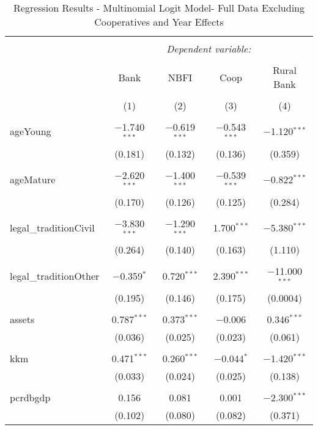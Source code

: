 \documentclass[a4paper,nobind]{templates/ociamthesis}
\begin{document}
\begin{table}[!htbp] \centering 
  \caption{Regression Results - Multinomial Logit Model- Full Data Excluding Cooperatives and Year Effects} 
  \label{} 
\footnotesize 
\begin{tabular}{@{\extracolsep{5pt}}lcccc} 
\\[-1.8ex]\hline 
\hline \\[-1.8ex] 
 & \multicolumn{4}{c}{\textit{Dependent variable:}} \\ 
\cline{2-5} 
\\[-1.8ex] & Bank & NBFI & Coop & Rural Bank \\ 
\\[-1.8ex] & (1) & (2) & (3) & (4)\\ 
\hline \\[-1.8ex] 
 ageYoung & $-$1.740$^{***}$ & $-$0.619$^{***}$ & $-$0.543$^{***}$ & $-$1.120$^{***}$ \\ 
  & (0.181) & (0.132) & (0.136) & (0.359) \\ 
  & & & & \\ 
 ageMature & $-$2.620$^{***}$ & $-$1.400$^{***}$ & $-$0.539$^{***}$ & $-$0.822$^{***}$ \\ 
  & (0.170) & (0.126) & (0.125) & (0.284) \\ 
  & & & & \\ 
 legal\_traditionCivil & $-$3.830$^{***}$ & $-$1.290$^{***}$ & 1.700$^{***}$ & $-$5.380$^{***}$ \\ 
  & (0.264) & (0.140) & (0.163) & (1.110) \\ 
  & & & & \\ 
 legal\_traditionOther & $-$0.359$^{*}$ & 0.720$^{***}$ & 2.390$^{***}$ & $-$11.000$^{***}$ \\ 
  & (0.195) & (0.146) & (0.175) & (0.0004) \\ 
  & & & & \\ 
 assets & 0.787$^{***}$ & 0.373$^{***}$ & $-$0.006 & 0.346$^{***}$ \\ 
  & (0.036) & (0.025) & (0.023) & (0.061) \\ 
  & & & & \\ 
 kkm & 0.471$^{***}$ & 0.260$^{***}$ & $-$0.044$^{*}$ & $-$1.420$^{***}$ \\ 
  & (0.033) & (0.024) & (0.025) & (0.138) \\ 
  & & & & \\ 
 pcrdbgdp & 0.156 & 0.081 & 0.001 & $-$2.300$^{***}$ \\ 
  & (0.102) & (0.080) & (0.082) & (0.371) \\ 

\end{tabular}
\end{table}
\end{document}
